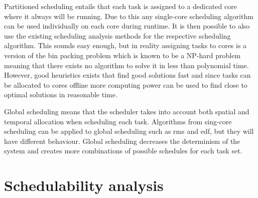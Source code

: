 \documentclass{kththesis}
\begin{document}
Partitioned scheduling entails that each task is assigned to a dedicated core where it always will
be running. Due to this any single-core scheduling algorithm can be used individually on each core
during runtime. It is then possible to also use the existing scheduling analysis methods for the
respective scheduling algorithm.  This sounds easy enough, but in reality assigning tasks to cores
is a version of the bin packing problem which is known to be a NP-hard problem meaning that there
exists no algorithm to solve it in less than polynomial time. However, good heuristics
\parencite{johnson_fast_1974}\parencite{coffman_application_1978} exists that find good solutions
fast and since tasks can be allocated to cores offline more computing power can be used to find
close to optimal solutions in reasonable time.

Global scheduling means that the scheduler takes into account both spatial and temporal allocation
when scheduling each task. Algorithms from sing-core scheduling can be applied to global scheduling
such as \acrshort{rms} and \acrshort{edf}, but they will have different behaviour. Global scheduling
decreases the determinism of the system and creates more combinations of possible schedules for each
task set.

\section{Schedulability analysis}
\end{document}
